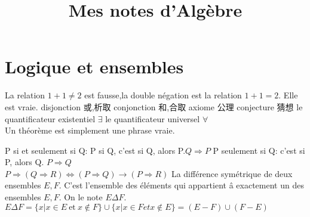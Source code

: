 \documentclass{article}
\begin{document}
\title{Mes notes d'Alg\`ebre}
\maketitle
\tableofcontents
\newpage

\newtheorem{definition}{D\'efintion} %
\newtheorem*{thmwn}{Thm} %
\newtheorem{theorem}{Th\'eor\`eme}[section]%
\newtheorem{lemma}[theorem]{Lemme}%
\newtheorem{proposition}{Proposition}[section]%
\newtheorem{corollary}{Corollary}[theorem]%
\newtheorem{example}{Example}%
\newtheorem*{attention}{Attention}
\newtheorem*{note}{Note}
\newtheorem{question}{Question}[section]


\section{Logique et ensembles}
La relation $1+1 \neq 2$ est fausse,la double n\'egation est la relation $1+1=2$. Elle est vraie.
\newline
disjonction 或,析取 \newline
conjonction 和,合取 \newline
axiome 公理 \newline
conjecture 猜想\newline
le quantificateur existentiel $\exists$ \newline
le quantificateur universel $\forall$ \newline
\\
Un th\'eor\`eme est simplement une phrase vraie. \newline

P si et seulement si Q: \newline
P si Q, c'est si Q, alors P.\quad $Q \Rightarrow P$ \newline
P seulement si Q: c'est si P, alors Q. \quad $P \Rightarrow Q$
\\
$P \Rightarrow (Q \Rightarrow R)\Leftrightarrow (P \Rightarrow Q)\rightarrow (P \Rightarrow R)$ \newline
La diff\'erence sym\'etrique de deux ensembles $E,F$. C'est l'ensemble des \'el\'ements qui appartient \^a exactement un des ensembles $E,F$. On le note $ E \Delta F $.
\newline
$
E \Delta F=\{x|x\in E ~\mathrm{et} ~x \not \in F\}\cup\{x|x\in F et x \not \in E\}=(E-F)\cup(F-E)
$
\end{document}
